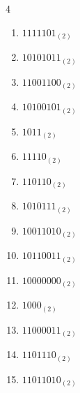 \begin{multicols}{4}
\begin{enumerate}
        \phantom{$=227$}

  \item $1111101_{(2)}$

        \phantom{$=125$}

\columnbreak %

\resetques

  \item $10101011_{(2)}$

        \phantom{$=171$}

  \item $11001100_{(2)}$

        \phantom{$=204$}

  \item $10100101_{(2)}$

        \phantom{$=165$}

  \item $1011_{(2)}$

        \phantom{$=11$}

  \item $11110_{(2)}$

        \phantom{$=30$}

  \item $110110_{(2)}$

        \phantom{$=54$}

  \item $1010111_{(2)}$

        \phantom{$=87$}

  \item $10011010_{(2)}$

        \phantom{$=154$}

  \item $10110011_{(2)}$

        \phantom{$=179$}

  \item $10000000_{(2)}$

        \phantom{$=128$}

  \item $1000_{(2)}$

        \phantom{$=8$}

  \item $11000011_{(2)}$

        \phantom{$=195$}

  \item $1101110_{(2)}$

        \phantom{$=110$}

  \item $11011010_{(2)}$


\end{enumerate}
\end{multicols}
